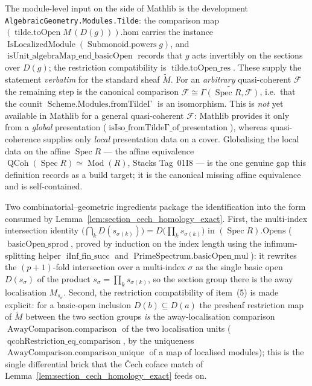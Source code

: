 \begin{definition}
  The module-level input on the side of Mathlib is the development
  \texttt{AlgebraicGeometry.Modules.Tilde}: the comparison map
  \((\operatorname{tilde.toOpen} M\, (D(g))).\mathrm{hom}\) carries the instance
  \(\operatorname{IsLocalizedModule}(\operatorname{Submonoid.powers} g)\), and
  \(\operatorname{isUnit\_algebraMap\_end\_basicOpen}\) records that \(g\) acts
  invertibly on the sections over \(D(g)\); the restriction compatibility is
  \(\operatorname{tilde.toOpen\_res}\). These supply the statement \emph{verbatim} for
  the standard sheaf \(\widetilde{M}\). For an \emph{arbitrary} quasi-coherent
  \(\mathcal{F}\) the remaining step is the canonical comparison
  \(\mathcal{F} \cong \widetilde{\Gamma(\operatorname{Spec} R, \mathcal{F})}\), i.e.\
  that the counit \(\operatorname{Scheme.Modules.fromTildeΓ}\) is an isomorphism. This
  is \emph{not} yet available in Mathlib for a general quasi-coherent \(\mathcal{F}\):
  Mathlib provides it only from a \emph{global} presentation
  (\(\operatorname{isIso\_fromTildeΓ\_of\_presentation}\)), whereas quasi-coherence
  supplies only \emph{local} presentation data on a cover. Globalising the local data
  on the affine \(\operatorname{Spec} R\) --- the affine equivalence
  \(\operatorname{QCoh}(\operatorname{Spec} R) \simeq \operatorname{Mod}(R)\), Stacks
  Tag~01I8 --- is the one genuine gap this definition records as a build target; it is
  the canonical missing affine equivalence and is self-contained.

  Two combinatorial--geometric ingredients package the identification into the form
  consumed by Lemma~\ref{lem:section_cech_homology_exact}. First, the multi-index
  intersection identity
  \(\bigl(\bigcap_k D(s_{\sigma(k)})\bigr) = D\bigl(\prod_k s_{\sigma(k)}\bigr)\) in
  \((\operatorname{Spec} R).\mathrm{Opens}\) (\(\operatorname{basicOpen\_sprod}\), proved
  by induction on the index length using the infimum-splitting helper
  \(\operatorname{iInf\_fin\_succ}\) and \(\operatorname{PrimeSpectrum.basicOpen\_mul}\)):
  it rewrites the \((p+1)\)-fold intersection over a multi-index \(\sigma\) as the single
  basic open \(D(s_\sigma)\) of the product \(s_\sigma = \prod_k s_{\sigma(k)}\), so the
  section group there is the away localisation \(M_{s_\sigma}\). Second, the restriction
  compatibility of item~(5) is made explicit: for a basic-open inclusion
  \(D(b) \subseteq D(a)\) the presheaf restriction map of \(\widetilde{M}\) between the
  two section groups \emph{is} the away-localisation comparison
  \(\operatorname{AwayComparison.comparison}\) of the two localisation units
  (\(\operatorname{qcohRestriction\_eq\_comparison}\), by the uniqueness
  \(\operatorname{AwayComparison.comparison\_unique}\) of a map of localised modules);
  this is the single differential brick that the {\v C}ech coface match of
  Lemma~\ref{lem:section_cech_homology_exact} feeds on.


\end{definition}
